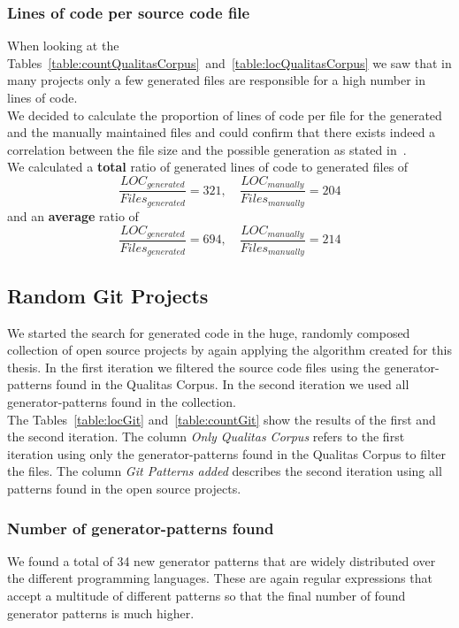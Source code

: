 

\subsubsection{Lines of code per source code file}
When looking at the Tables~\ref{table:countQualitasCorpus}~and~\ref{table:locQualitasCorpus} we saw that in many projects only a few generated files are responsible for a high number in lines of code.\\
We decided to calculate the proportion of lines of code per file for the generated and the manually maintained files and could confirm that there exists indeed a correlation between the file size and the possible generation as stated in~\cite{Bernwieser2014}.\\
We calculated a \textbf{total} ratio of generated lines of code to generated files of 
\begin{equation}
	\frac{LOC_{generated}}{Files_{generated}} = 321 , \quad \frac{LOC_{manually}}{Files_{manually}} = 204
\end{equation}
and an \textbf{average} ratio of
\begin{equation}
	\frac{LOC_{generated}}{Files_{generated}} = 694 , \quad \frac{LOC_{manually}}{Files_{manually}} = 214
\end{equation}

\subsection{Random Git Projects}
We started the search for generated code in the huge, randomly composed collection of open source projects by again applying the algorithm created for this thesis. In the first iteration we filtered the source code files using the generator-patterns found in the Qualitas Corpus. In the second iteration we used all generator-patterns found in the collection. \\
The Tables~\ref{table:locGit} and~\ref{table:countGit} show the results of the first and the second iteration. The column \textit{Only Qualitas Corpus} refers to the first iteration using only the generator-patterns found in the Qualitas Corpus to filter the files. The column \textit{Git Patterns added} describes the second iteration using all patterns found in the open source projects.

\subsubsection{Number of generator-patterns found}
We found a total of 34 new generator patterns that are widely distributed over the different programming languages. These are again regular expressions that accept a multitude of different patterns so that the final number of found generator patterns is much higher.

